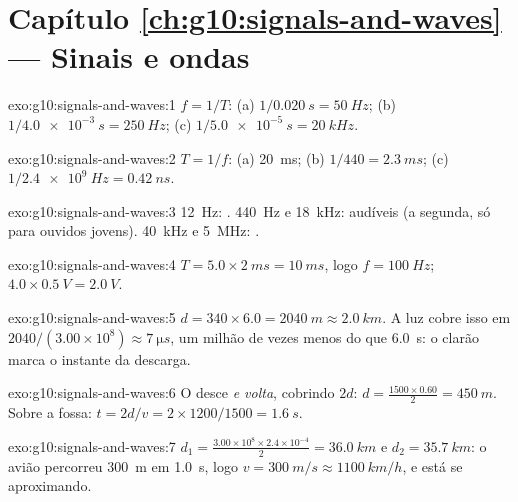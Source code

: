 \section*{Capítulo \ref{ch:g10:signals-and-waves} --- Sinais e ondas}

\begin{solution}{exo:g10:signals-and-waves:1}
$f = 1/T$: (a) $1/\qty{0.020}{s} = \qty{50}{Hz}$;
(b) $1/\qty{4.0e-3}{s} = \qty{250}{Hz}$;
(c) $1/\qty{5.0e-5}{s} = \qty{20}{kHz}$.
\end{solution}

\begin{solution}{exo:g10:signals-and-waves:2}
$T = 1/f$: (a) \qty{20}{ms}; (b) $1/440 = \qty{2.3}{ms}$;
(c) $1/\qty{2.4e9}{Hz} = \qty{0.42}{ns}$.
\end{solution}

\begin{solution}{exo:g10:signals-and-waves:3}
\qty{12}{Hz}: . \qty{440}{Hz} e \qty{18}{kHz}: audíveis (a
segunda, só para ouvidos jovens). \qty{40}{kHz} e \qty{5}{MHz}:
.
\end{solution}

\begin{solution}{exo:g10:signals-and-waves:4}
$T = 5.0 \times \qty{2}{ms} = \qty{10}{ms}$, logo $f = \qty{100}{Hz}$;
 $4.0 \times \qty{0.5}{V} = \qty{2.0}{V}$.
\end{solution}

\begin{solution}{exo:g10:signals-and-waves:5}
$d = 340 \times 6.0 = \qty{2040}{m} \approx \qty{2.0}{km}$. A luz cobre
isso em $2040/(3.00\times10^{8}) \approx \qty{7}{\micro s}$, um milhão de
vezes menos do que \qty{6.0}{s}: o clarão marca o instante da descarga.
\end{solution}

\begin{solution}{exo:g10:signals-and-waves:6}
O  desce \emph{e volta}, cobrindo $2d$:
$d = \frac{1500 \times 0.60}{2} = \qty{450}{m}$. Sobre a fossa:
$t = 2d/v = 2 \times 1200/1500 = \qty{1.6}{s}$.
\end{solution}

\begin{solution}{exo:g10:signals-and-waves:7}
$d_1 = \frac{3.00\times10^{8} \times 2.4\times10^{-4}}{2} =
\qty{36.0}{km}$ e $d_2 = \qty{35.7}{km}$: o avião percorreu \qty{300}{m}
em \qty{1.0}{s}, logo $v = \qty{300}{m/s} \approx \qty{1100}{km/h}$, e
está se aproximando.
\end{solution}

